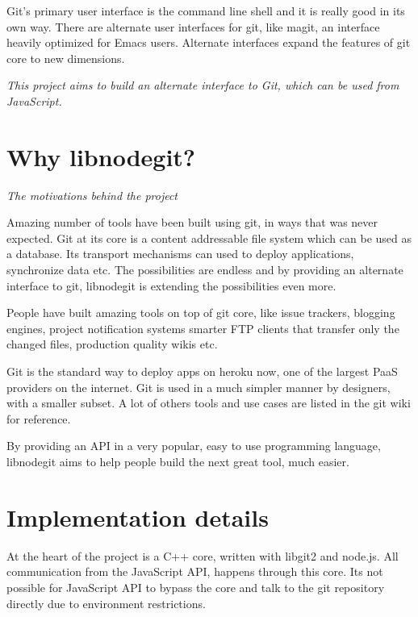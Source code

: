 Git's primary user interface is the command line shell and it is really good in
its own way. There are alternate user interfaces for git, like
magit\cite{magit}, an interface heavily optimized for Emacs\cite{emacs} users.
Alternate interfaces expand the features of git core to new dimensions.

\emph{This project aims to build an alternate interface to Git, which can be
  used from JavaScript.}

\section{Why libnodegit?}

\newcommand\sectionTitle[1]{\begin{flushright}\textit{#1}\end{flushright}}
\sectionTitle{The motivations behind the project}

Amazing number of tools have been built using git, in ways that was never
expected. Git at its core is a content addressable file system which can be used
as a database. Its transport mechanisms can used to deploy applications,
synchronize data etc. The possibilities are endless and by providing an
alternate interface to git, libnodegit is extending the possibilities even more.

People have built amazing tools on top of git core, like issue
trackers\cite{gaskit}, blogging engines\cite{octopress}, project notification
systems\cite{git-dude} smarter FTP clients\cite{git-ftp} that transfer only the
changed files, production quality\cite{gollum-imporoved} wikis\cite{gollum} etc.

Git is the standard way to deploy apps on heroku\cite{git-heroku} now, one of
the largest PaaS\cite{PaaS} providers on the internet. Git is used in a much
simpler manner by designers\cite{git-designers}, with a smaller subset. A lot of
others tools and use cases are listed in the git wiki\cite{git-tools} for
reference.

By providing an API in a very popular, easy to use programming language,
libnodegit aims to help people build the next great tool, much easier.

\section{Implementation details}

At the heart of the project is a C++ core, written with libgit2\cite{libgit2}
and node.js\cite{node}. All communication from the JavaScript API, happens
through this core. Its not possible for JavaScript API to bypass the core and
talk to the git repository directly due to environment restrictions.

